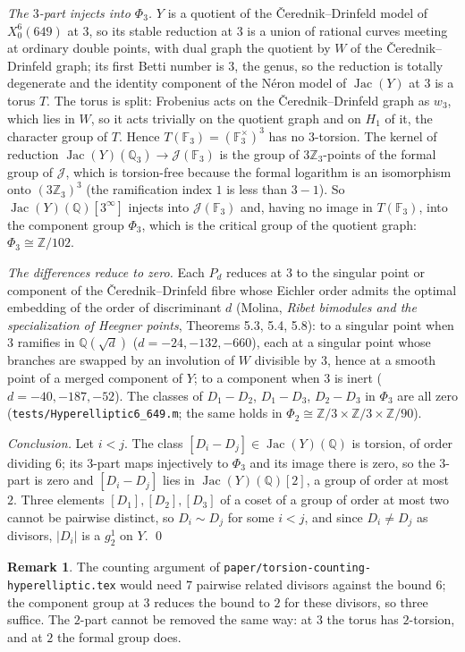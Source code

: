 \documentclass[11pt,reqno]{amsart}
\theoremstyle{plain}
\theoremstyle{definition}
\newtheorem{remark}[theorem]{Remark}
\DeclareMathOperator{\Jac}{Jac}
\newcommand{\Q}{\mathbb{Q}}
\newcommand{\Z}{\mathbb{Z}}
\newcommand{\F}{\mathbb{F}}
\begin{document}
\emph{The $3$-part injects into $\Phi_3$.} $Y$ is a quotient of the \v{C}erednik--Drinfeld model of $X_0^6(649)$
at $3$, so its stable reduction at $3$ is a union of rational curves meeting at ordinary double points, with
dual graph the quotient by $W$ of the \v{C}erednik--Drinfeld graph; its first Betti number is $3$, the genus,
so the reduction is totally degenerate and the identity component of the N\'eron model of $\Jac(Y)$ at $3$ is
a torus $T$. The torus is split: Frobenius acts on the \v{C}erednik--Drinfeld graph as $w_3$, which lies in
$W$, so it acts trivially on the quotient graph and on $H_1$ of it, the character group of $T$. Hence
$T(\F_3)=(\F_3^\times)^3$ has no $3$-torsion. The kernel of reduction $\Jac(Y)(\Q_3)\to\mathcal J(\F_3)$ is
the group of $3\Z_3$-points of the formal group of $\mathcal J$, which is torsion-free because the formal
logarithm is an isomorphism onto $(3\Z_3)^3$ (the ramification index $1$ is less than $3-1$). So
$\Jac(Y)(\Q)[3^\infty]$ injects into $\mathcal J(\F_3)$ and, having no image in $T(\F_3)$, into the component
group $\Phi_3$, which is the critical group of the quotient graph: $\Phi_3\cong\Z/102$.

\emph{The differences reduce to zero.} Each $P_d$ reduces at $3$ to the singular point or component of the
\v{C}erednik--Drinfeld fibre whose Eichler order admits the optimal embedding of the order of discriminant $d$
(Molina, \emph{Ribet bimodules and the specialization of Heegner points}, Theorems 5.3, 5.4, 5.8): to a singular
point when $3$ ramifies in $\Q(\sqrt d)$ ($d=-24,-132,-660$), each at a singular point whose branches are
swapped by an involution of $W$ divisible by $3$, hence at a smooth point of a merged component of $Y$; to a
component when $3$ is inert ($d=-40,-187,-52$). The classes of $D_1-D_2$, $D_1-D_3$, $D_2-D_3$ in $\Phi_3$ are
all zero (\texttt{tests/Hyperelliptic6\_649.m}; the same holds in $\Phi_2\cong\Z/3\times\Z/3\times\Z/90$).

\emph{Conclusion.} Let $i<j$. The class $[D_i-D_j]\in\Jac(Y)(\Q)$ is torsion, of order dividing $6$; its
$3$-part maps injectively to $\Phi_3$ and its image there is zero, so the $3$-part is zero and
$[D_i-D_j]$ lies in $\Jac(Y)(\Q)[2]$, a group of order at most $2$. Three elements $[D_1],[D_2],[D_3]$ of a
coset of a group of order at most two cannot be pairwise distinct, so $D_i\sim D_j$ for some $i<j$, and since
$D_i\neq D_j$ as divisors, $|D_i|$ is a $g^1_2$ on $Y$. \qed

\begin{remark}
The counting argument of \texttt{paper/torsion-counting-hyperelliptic.tex} would need $7$ pairwise related divisors
against the bound $6$; the component group at $3$ reduces the bound to $2$ for these divisors, so three suffice.
The $2$-part cannot be removed the same way: at $3$ the torus has $2$-torsion, and at $2$ the formal group does.
\end{remark}
\end{document}
